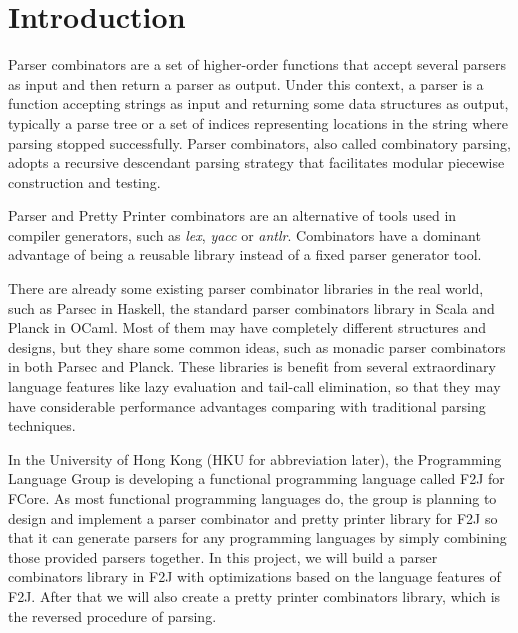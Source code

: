 \chapter{Introduction}

Parser combinators are a set of higher-order functions that accept several parsers as input and then return a parser as output. Under this context, a parser is a function accepting strings as input and returning some data structures as output, typically a parse tree or a set of indices representing locations in the string where parsing stopped successfully. Parser combinators, also called combinatory parsing, adopts a recursive descendant parsing strategy that facilitates modular piecewise construction and testing.

Parser and Pretty Printer combinators are an alternative of tools used in compiler generators, such as \textit{lex}, \textit{yacc} or \textit{antlr}. Combinators have a dominant advantage of being a reusable library instead of a fixed parser generator tool.

There are already some existing parser combinator libraries in the real world, such as Parsec \cite{Leijen:2002} in Haskell, the standard parser combinators library in Scala and Planck \cite{Planck} in OCaml. Most of them may have completely different structures and designs, but they share some common ideas, such as monadic parser combinators in both Parsec and Planck. These libraries is benefit from several extraordinary language features like lazy evaluation and tail-call elimination, so that they may have considerable performance advantages comparing with traditional parsing techniques.

In the University of Hong Kong (HKU for abbreviation later), the Programming Language Group is developing a functional programming language called F2J for FCore. As most functional programming languages do, the group is planning to design and implement a parser combinator and pretty printer library for F2J so that it can generate parsers for any programming languages by simply combining those provided parsers together. In this project, we will build a parser combinators library in F2J with optimizations based on the language features of F2J. After that we will also create a pretty printer combinators library, which is the reversed procedure of parsing.
